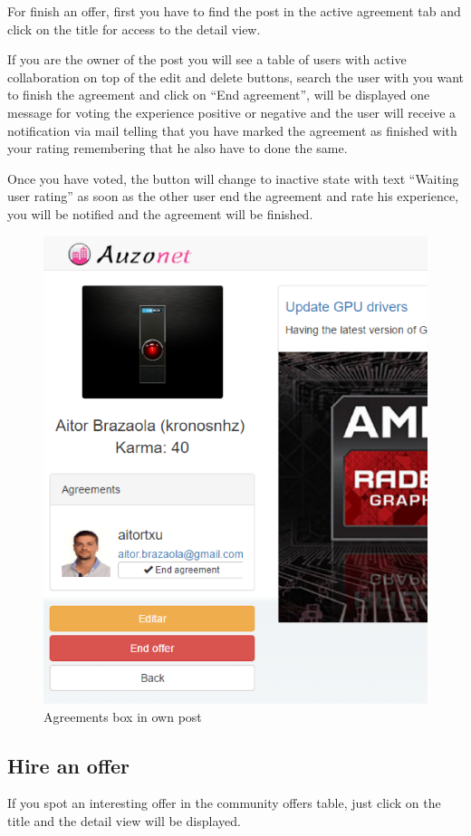 \documentclass{DeustoFDP}
\begin{document}
For finish an offer, first you have to find the post in the active agreement tab and click on the title for access to the detail view.

If you are the owner of the post you will see a table of users with active collaboration on top of the edit and delete buttons, search the user with you want to finish the agreement and click on “End agreement”, will be displayed one message for voting the experience positive or negative and the user will receive a notification via mail telling that you have marked the agreement as finished with your rating remembering that he also have to done the same.

Once you have voted, the button will change to inactive state with text “Waiting user rating” as soon as the other user end the agreement and rate his experience, you will be notified and the agreement will be finished.

\begin{figure}[h!]
\centering
\includegraphics[width=0.9\linewidth]{fig/Manual/endagreementsowner}
\caption[Agreements box in own post]{Agreements box in own post}
\label{fig:endagreementsowner}
\end{figure}

\newpage
\subsection{Hire an offer}
If you spot an interesting offer in the community offers table, just click on the title and the detail view will be displayed. 
\end{document}
